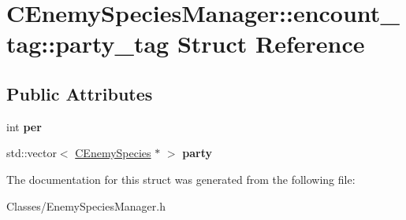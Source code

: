 \hypertarget{struct_c_enemy_species_manager_1_1encount__tag_1_1party__tag}{}\section{C\+Enemy\+Species\+Manager\+:\+:encount\+\_\+tag\+:\+:party\+\_\+tag Struct Reference}
\label{struct_c_enemy_species_manager_1_1encount__tag_1_1party__tag}
\subsection*{Public Attributes}
\begin{DoxyCompactItemize}
\item 
int {\bfseries per}\hypertarget{struct_c_enemy_species_manager_1_1encount__tag_1_1party__tag_abd235dd819697b7932d093084228982e}{}\label{struct_c_enemy_species_manager_1_1encount__tag_1_1party__tag_abd235dd819697b7932d093084228982e}

\item 
std\+::vector$<$ \hyperlink{class_c_enemy_species}{C\+Enemy\+Species} $\ast$ $>$ {\bfseries party}\hypertarget{struct_c_enemy_species_manager_1_1encount__tag_1_1party__tag_a7b7fb8ccde65967a4627fc97e1e7a593}{}\label{struct_c_enemy_species_manager_1_1encount__tag_1_1party__tag_a7b7fb8ccde65967a4627fc97e1e7a593}

\end{DoxyCompactItemize}


The documentation for this struct was generated from the following file\+:\begin{DoxyCompactItemize}
\item 
Classes/Enemy\+Species\+Manager.\+h\end{DoxyCompactItemize}
